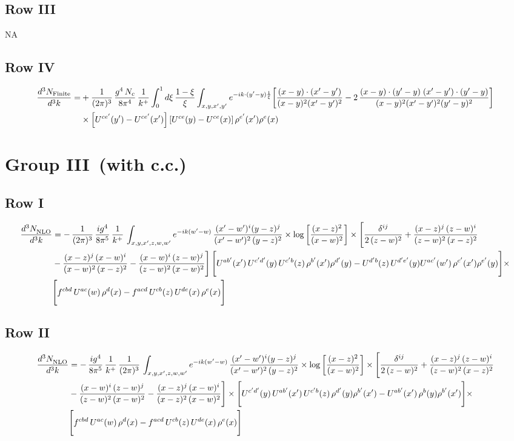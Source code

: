 \documentclass[9pt]{article}
\numberwithin{equation}{section}
\begin{document}
\subsection{Row III}
\textsc{NA}
\subsection{Row IV}
\begin{align}
\frac{d^{3}N_{\rm Finite}}{d^{3}k}= &  +\frac{1}{(2\pi)^{3}}\,\frac{g^{4}\,N_{c}}{8\pi^{4}}\,\frac{1}{k^{+}}\int_{0}^{1}d\xi\,\frac{1-\xi}{\xi}\int_{x,y,x',y'}e^{-ik\cdot(y'-y)\frac{1}{\xi}}\bigg[\frac{(x-y)\cdot(x'-y')}{(x-y)^{2}(x'-y')^{2}}-2\,\frac{(x-y)\cdot(y'-y)\;(x'-y')\cdot(y'-y)}{(x-y)^{2}(x'-y')^{2}(y'-y)^{2}}\bigg]\notag\\
&\times\left[U^{ce'}(y') - U^{ce'}(x')\right]\left[U^{ce}(y) - U^{ce}(x)\right]\rho^{e'}(x')\rho^{e}(x)
\end{align}
\section{Group III\, (with c.c.)}
\subsection{Row I}
\begin{align}
     \frac{d^{3}N_{\rm NLO}^{\rm}}{d^{3}k}  & =   -\,\frac{1}{(2\pi)^{3}}\, \frac{ig^{4}}{8\pi^{5}}\,\frac{1}{k^{+}}\,\int_{x,y,x',z,w,w^{\prime}} e^{-ik(w^{\prime}-w)}\,\frac{(x'-w')^{i}(y-z)^{j}}{(x'-w')^{2}\,(y-z)^{2}}\times \log{\left[\frac{(x-z)^{2}}{(x-w)^{2}}\right]}\times \Bigg[\frac{\delta^{ij}}{2\,(z-w)^{2}}+\frac{(x-z)^{j}\,(z-w)^{i}}{(z-w)^{2}\,(x-z)^{2}}\notag \\ & -\frac{(x-z)^{j}\,(x-w)^{i}}{(x-w)^{2}\,(x-z)^{2}}-\frac{(x-w)^{i}\,(z-w)^{j}}{(z-w)^{2}\,(x-w)^{2}}\Bigg]\, \Bigg[U^{ab'}(x')\,U^{c'd'}(y)\,U^{c'b}(z)\,\rho^{b'}(x')\rho^{d'}(y)-U^{d'b}(z)\,U^{d'e'}(y)U^{ac'}(w')\,\rho^{c'}(x')\rho^{e'}(y)\Bigg]\times\notag \\ & \Bigg[f^{cbd}\,U^{ac}(w)\,\rho^{d}(x)-f^{acd}\, U^{cb}(z)\,U^{de}(x)\,\rho^{e}(x)\Bigg]
\end{align}
\subsection{Row II}
\begin{align}
     \frac{d^{3}N_{\rm NLO}^{\rm}}{d^{3}k}  & =    
 -\,\frac{ig^{4}}{8\pi^{5}}\,\frac{1}{k^{+}}\,\frac{1}{(2\pi)^{3}}\, \int_{x,y,x',z,w,w^{\prime}} e^{-ik(w^{\prime}-w)}\,\frac{(x'-w')^{i}(y-z)^{j}}{(x'-w')^{2}\,(y-z)^{2}}\times \log{\left[\frac{(x-z)^{2}}{(x-w)^{2}}\right]}\times \Bigg[\frac{\delta^{ij}}{2\,(z-w)^{2}}+\frac{(x-z)^{j}\,(z-w)^{i}}{(z-w)^{2}\,(x-z)^{2}}\notag \\ & -\frac{(x-w)^{i}\,(z-w)^{j}}{(z-w)^{2}\,(x-w)^{2}}-\frac{(x-z)^{j}\,(x-w)^{i}}{(x-z)^{2}\,(x-w)^{2}}\Bigg]\times \Bigg[U^{c'd'}(y)\,U^{ab'}(x')\,U^{c'b}(z)\,\rho^{d'}(y)\rho^{b'}(x')-U^{ab'}(x')\,\rho^{b}(y)\rho^{b'}(x')\Bigg]\times\notag \\ & \Bigg[f^{cbd}\,U^{ac}(w)\,\rho^{d}(x)-f^{acd}\, U^{cb}(z)\,U^{de}(x)\,\rho^{e}(x)\Bigg]
\end{align}
\end{document}
